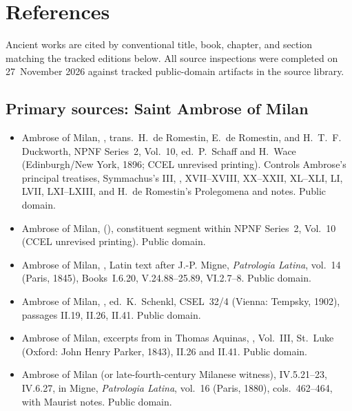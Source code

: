 \section{References}

\begingroup
\raggedright

Ancient works are cited by conventional title, book, chapter, and section matching the tracked editions below. All source inspections were completed on 27~November 2026 against tracked public-domain artifacts in the source library.

\subsection*{Primary sources: Saint Ambrose of Milan}

\begin{itemize}
\item Ambrose of Milan, , trans.\ H.~de Romestin, E.~de Romestin, and H.~T.~F. Duckworth, NPNF Series~2, Vol.~10, ed.\ P.~Schaff and H.~Wace (Edinburgh/New York, 1896; CCEL unrevised printing). Controls Ambrose's principal treatises, Symmachus's  III, ,  XVII--XVIII, XX--XXII, XL--XLI, LI, LVII, LXI--LXIII, and H.~de Romestin's Prolegomena and notes. Public domain.
\item Ambrose of Milan,  (), constituent segment within NPNF Series~2, Vol.~10 (CCEL unrevised printing). Public domain.
\item Ambrose of Milan, , Latin text after J.-P. Migne, \textit{Patrologia Latina}, vol.~14 (Paris, 1845), Books~I.6.20, V.24.88--25.89, VI.2.7--8. Public domain.
\item Ambrose of Milan, , ed.\ K.~Schenkl, CSEL~32/4 (Vienna: Tempsky, 1902), passages II.19, II.26, II.41. Public domain.
\item Ambrose of Milan, excerpts from  in Thomas Aquinas, , Vol.~III, St.~Luke (Oxford: John Henry Parker, 1843), II.26 and II.41. Public domain.
\item Ambrose of Milan (or late-fourth-century Milanese witness),  IV.5.21--23, IV.6.27, in Migne, \textit{Patrologia Latina}, vol.~16 (Paris, 1880), cols.~462--464, with Maurist notes. Public domain.
\end{itemize}

